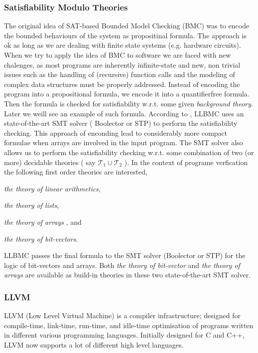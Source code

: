 \documentclass[14pt]{article}
\begin{document}
{\subsubsection*{ Satisfiability Modulo Theories}\label{ Satisfiability Modulo Theories}
The original idea of SAT-based Bounded Model Checking (BMC) was to encode the  bounded behaviours of the system as propositinal formula. The approach is ok as long as we are dealing with finite state systems (e.g. hardware circuits). When we try to apply the idea of BMC to software we are faced with new chalenges, as most  programs are inherently infinite-state and new, non trivial issues such as the handling of (recursive) function calls and the modeling of complex data structures must be properly addressed.  Instead of encoding the program into a propositional formula, we encode it into a quantifierfree formula. Then the formula is checked for satisfiability w.r.t. some given \textit {background theory}. Later we weill see an example of such formula. According to  \cite{llbmc}, LLBMC uses an state-of-the-art SMT solver ( Boolector or STP) to perform the satisfiability checking. This approach of enconding lead to considerably more compact formulae when arrays are involved in the input program. The SMT solver also allows us to perform the satisfiability checking w.r.t. some combination of two (or more) decidable theories ( say \(\mathcal{T}_1 \cup \mathcal{T}_2\) ). In the context of programe verfication the following first order theories are interested,  
  \begin{inparaenum}
    \item \textit {the theory of linear arithmetics},
    \item \textit {the theory of lists},
    \item \textit {the theory of arrays} , and 
    \item \textit {the theory of bit-vectors}.
  \end{inparaenum}
LLBMC passes the final formula to the SMT solver (Boolector or STP) for the logic of bit-vectors and arrays. Both \textit {the theory of bit-vector} and \textit {the theory of arrays} are available as build-in theories in these two  state-of-the-art SMT solver.

\subsubsection*{LLVM}
LLVM (Low Level Virtual Machine)   \cite{llvm} is a compiler infrastructure; designed for compile-time, link-time, run-time, and idle-time optimisation of programs written in different various programming languages. Initially designed for C and C++, LLVM now supports a lot of different high level languages.

}
\end{document}

